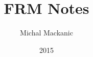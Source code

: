 \documentclass[a4paper]{book}
\begin{document}
\title{FRM Notes}
\author{Michal Mackanic}
\date{2015}
\maketitle

\tableofcontents



\end{document}
